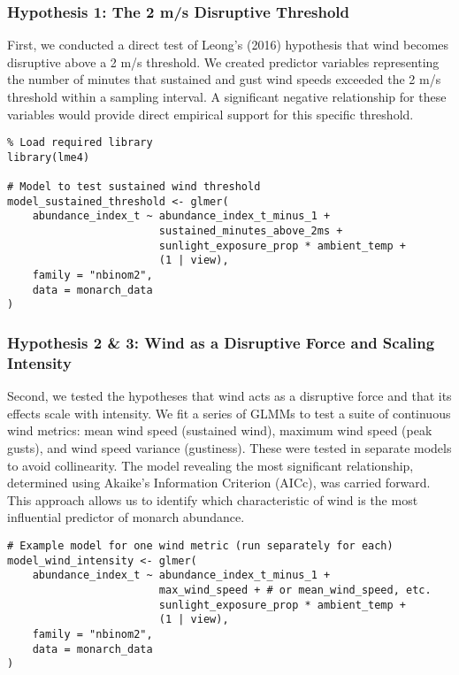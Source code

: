 \subsubsection{Hypothesis 1: The 2 m/s Disruptive Threshold}

First, we conducted a direct test of Leong's (2016) hypothesis that wind becomes disruptive above a 2 m/s threshold. We created predictor variables representing the number of minutes that sustained and gust wind speeds exceeded the 2 m/s threshold within a sampling interval. A significant negative relationship for these variables would provide direct empirical support for this specific threshold.

\begin{verbatim}
% Load required library
library(lme4)

# Model to test sustained wind threshold
model_sustained_threshold <- glmer(
    abundance_index_t ~ abundance_index_t_minus_1 + 
                        sustained_minutes_above_2ms + 
                        sunlight_exposure_prop * ambient_temp +
                        (1 | view),
    family = "nbinom2",
    data = monarch_data
)
\end{verbatim}

\subsubsection{Hypothesis 2 & 3: Wind as a Disruptive Force and Scaling Intensity}

Second, we tested the hypotheses that wind acts as a disruptive force and that its effects scale with intensity. We fit a series of GLMMs to test a suite of continuous wind metrics: mean wind speed (sustained wind), maximum wind speed (peak gusts), and wind speed variance (gustiness). These were tested in separate models to avoid collinearity. The model revealing the most significant relationship, determined using Akaike’s Information Criterion (AICc), was carried forward. This approach allows us to identify which characteristic of wind is the most influential predictor of monarch abundance.

\begin{verbatim}
# Example model for one wind metric (run separately for each)
model_wind_intensity <- glmer(
    abundance_index_t ~ abundance_index_t_minus_1 + 
                        max_wind_speed + # or mean_wind_speed, etc.
                        sunlight_exposure_prop * ambient_temp +
                        (1 | view),
    family = "nbinom2",
    data = monarch_data
)
\end{verbatim}

